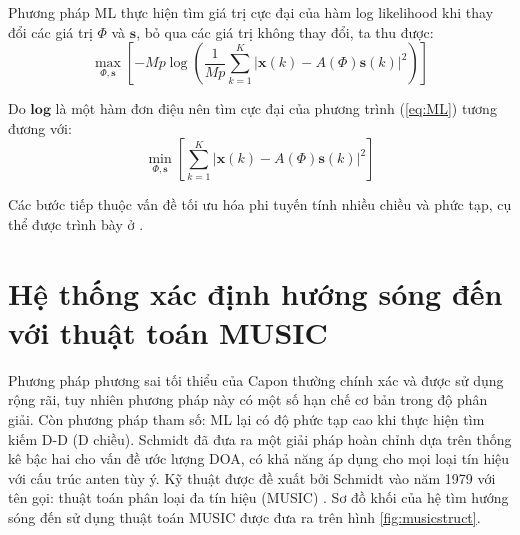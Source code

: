 Phương pháp ML thực hiện tìm giá trị cực đại của hàm log likelihood khi thay đổi các giá trị $\Phi$ và $\mathbf{s}$, bỏ qua các giá trị không thay đổi, ta thu được:
\begin{equation}
	\underset{\Phi, \mathbf{s}}{\max} \left[-Mp\log(\frac{1}{Mp}\sum_{k=1}^{K}|\mathbf{x}(k) - A(\Phi)\mathbf{s}(k)|^2)\right]
\label{eq:ML}
\end{equation}

Do $\mathbf{log}$ là một hàm đơn điệu nên tìm cực đại của phương trình (\ref{eq:ML}) tương đương với:
\begin{equation}
	\underset{\Phi, \mathbf{s}}{\min} \left[\sum_{k=1}^{K}|\mathbf{x}(k) - A(\Phi)\mathbf{s}(k)|^2\right]
\label{eq:ML1}
\end{equation}

Các bước tiếp thuộc vấn đề tối ưu hóa phi tuyến tính nhiều chiều và phức tạp, cụ thể được trình bày ở \cite{Ziskind1988}.

\section{Hệ thống xác định hướng sóng đến với thuật toán MUSIC}

Phương pháp phương sai tối thiểu của Capon thường chính xác và được sử dụng rộng rãi, tuy nhiên phương pháp này có một số hạn chế cơ bản trong độ phân giải. Còn phương pháp tham số: ML lại có độ phức tạp cao khi thực hiện tìm kiếm D-D (D chiều). Schmidt đã đưa ra một giải pháp hoàn chỉnh dựa trên thống kê bậc hai cho vấn đề ước lượng DOA, có khả năng áp dụng cho mọi loại tín hiệu với cấu trúc anten tùy ý. Kỹ thuật được đề xuất bởi Schmidt vào năm 1979 với tên gọi: thuật toán phân loại đa tín hiệu (MUSIC) \cite{Schmidt2009a}. Sơ đồ khối của hệ tìm hướng sóng đến sử dụng thuật toán MUSIC được đưa ra trên hình \ref{fig:musicstruct}.

